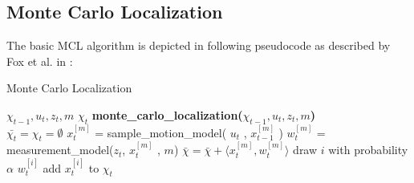\documentclass[	DIV=calc,%
							paper=a4,%
							fontsize=9pt,%
							twocolumn]{scrartcl}	 					%
\begin{document}
\subsection{Monte Carlo Localization}
\label{sec:MCL}
The basic MCL algorithm is depicted in following pseudocode  as described by Fox et al. in \cite{MonteCarloLocalization}:\\


\begin{algorithm}[h!]
\caption{Monte Carlo Localization}
\label{line}
\begin{algorithmic}[1]
$\chi_{t-1}, u_t, z_t,m$
$\chi_t$
\STATE \textbf{monte\_carlo\_localization(}$\chi_{t-1}, u_t, z_t,m$\textbf{)}\\
\STATE $\bar{\chi_t} = \chi_t = \emptyset$
\STATE {}$x^{[m]}_t$ = sample\_motion\_model( $u_t$ , $x^{[m]}_{t-1}$ )\;\label{alg:motion_model}
\STATE {}$w^{[m]}_t$ = measurement\_model($z_t$, $x^{[m]}_t$ , $m$)\;\label{alg:measurement_model}
\STATE {}$\bar{\chi} = \bar{\chi} + \langle x^{[m]}_t, w^{[m]}_t \rangle $\;
\ENDFOR
{} \label{alg:mcl_resampling}
\STATE draw $i$ with probability $\alpha$  $w^{[i]}_t$\;
\STATE add $x^{[i]}_t $ to $\chi_t$\;
\ENDFOR
\end{algorithmic}
\end{algorithm}
\end{document}
